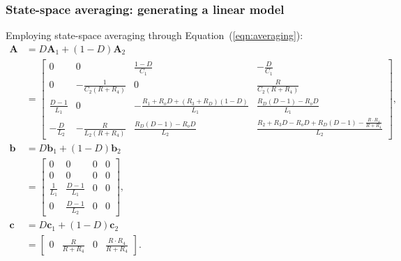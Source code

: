 \subsubsection{State-space averaging: generating a linear model}
Employing state-space averaging through Equation~(\ref{eqn:averaging}):
\begin{align}
\boldsymbol{A} &= D \boldsymbol{A}_1 + (1 - D) \boldsymbol{A}_2
\nonumber
\\[11pt]
&= \begin{bmatrix}
0 & 0 & \frac{1 - D}{C_1} & \minus\frac{D}{C_1}\\
0 & \minus\frac{1}{C_2(R + R_4)} & 0 & \frac{R}{C_2(R + R_4)}\\
\frac{D - 1}{L_1} & 0 & \minus\frac{R_1 + R_o D + (R_3 + R_D)(1 - D)}{L_1} & \frac{R_D (D - 1) - R_o D}{L_1}\\
\minus\frac{D}{L_2} & \minus\frac{R}{L_2(R + R_4)} & \frac{R_D (D - 1) - R_o D}{L_2} & \frac{R_2 + R_3 D - R_o D + R_D (D - 1) - \frac{R \cdot R_4}{R + R_4}}{L_2}
\end{bmatrix},
\label{eqn:A_avg}
\\[11pt]
\boldsymbol{b} &= D \boldsymbol{b}_1 + (1 - D) \boldsymbol{b}_2
\nonumber
\\[11pt]
&= \begin{bmatrix}
0 & 0 & 0 & 0\\
0 & 0 & 0 & 0\\
\frac{1}{L_1} & \frac{D - 1}{L_1} & 0 & 0\\
0 & \frac{D - 1}{L_2} & 0 & 0
\end{bmatrix},
\\[11pt]
\boldsymbol{c} &= D \boldsymbol{c}_1 + (1 - D) \boldsymbol{c}_2
\nonumber
\\[11pt]
&=
\begin{bmatrix}
0 & \frac{R}{R + R_4} & 0 & \frac{R \cdot R_4}{R + R_4}
\end{bmatrix}.
\label{eqn:c_avg}
\end{align}
